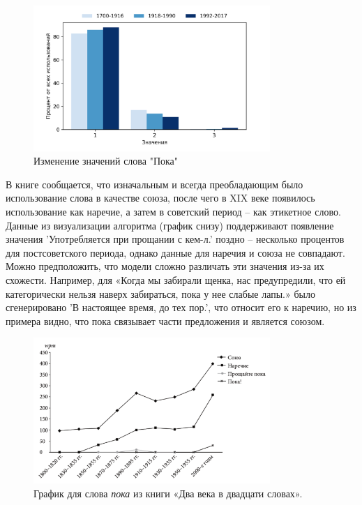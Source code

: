 \documentclass[LI,VKR]{HSEUniversity}
\begin{document}
\begin{figure}[H]
	\centering
	\includegraphics[width=0.8\textwidth]{img/visualizations/poka_minimal}
	\caption{Изменение значений слова "Пока"}
	\label{fig:Пока}
\end{figure}

В книге сообщается, что изначальным и всегда преобладающим было использование слова в качестве
союза, после чего в XIX веке появилось использование как наречие, а затем в советский период
– как этикетное слово.
Данные из визуализации алгоритма (график снизу) поддерживают появление значения
’Употребляется при прощании с кем-л.’
поздно – несколько процентов для постсоветского периода, однако данные для наречия и союза
не совпадают.
Можно предположить, что модели сложно различать эти значения из-за их схожести.
Например, для
«Когда мы забирали щенка, нас предупредили, что ей категорически нельзя наверх забираться,
пока у нее слабые лапы.»
было сгенерировано ’В настоящее время, до тех пор.’,
что относит его к наречию,
но из примера видно, что пока связывает части предложения и является союзом.

\begin{figure}[H]
    \centering %
    \includegraphics[width=0.8\textwidth]{img/book/poka/all}
    \caption{График для слова \textit{пока} из книги «Два века в двадцати словах».}
\end{figure}
\end{document}
